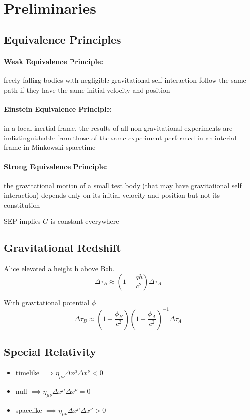 \documentclass[a4paper]{article}
\begin{document}
\maketitle

\section{Preliminaries}
\subsection{Equivalence Principles}

\paragraph{Weak Equivalence Principle:} freely falling bodies with negligible
gravitational self-interaction follow the same path if they have the same
initial velocity and position

\paragraph{Einstein Equivalence Principle:} in a local inertial frame, the
results of all non-gravitational experiments are indistinguishable from those
of the same experiment performed in an interial frame in Minkowski spacetime

\paragraph{Strong Equivalence Principle:} the gravitational motion of a small
test body (that may have gravitational self interaction) depends only on its
initial velocity and position but not its constitution

\begin{remark}
	SEP implies $G$ is constant everywhere
\end{remark}

\subsection{Gravitational Redshift}
Alice elevated a height h above Bob. 
\[
	\Delta \tau_B \approx \left(1-\frac{gh}{c^2}\right)\Delta \tau_A
\]

With gravitational potential $\phi$
\[
	\Delta \tau_B \approx
	\left(1+\frac{\phi_B}{c^2}\right)\left(1+\frac{\phi_A}{c^2}\right)^{-1}\Delta
	\tau_A
\]

\subsection{Special Relativity}
\begin{defi}
	\begin{itemize}
		\item timelike $\implies \eta_{\mu\nu}\Delta x^\mu \Delta x^\nu < 0$
		\item null $\implies \eta_{\mu\nu}\Delta x^\mu \Delta x^\nu = 0$
		\item spacelike $\implies \eta_{\mu\nu}\Delta x^\mu \Delta x^\nu > 0$
	\end{itemize}
\end{defi}
\end{document}
